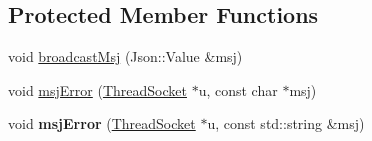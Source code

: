 \subsection*{Protected Member Functions}
\begin{DoxyCompactItemize}
\item 
void \hyperlink{classPartida_a515de07436fd6423d7da5d97952031e3}{broadcast\-Msj} (Json\-::\-Value \&msj)
\item 
void \hyperlink{classPartida_a395fb43392e03670c4c6a4a5f23bbd0c}{msj\-Error} (\hyperlink{classThreadSocket}{Thread\-Socket} $\ast$u, const char $\ast$msj)
\item 
\hypertarget{classPartida_af92865c689cd13fc25e16ee0424a6b80}{void {\bfseries msj\-Error} (\hyperlink{classThreadSocket}{Thread\-Socket} $\ast$u, const std\-::string \&msj)}\label{classPartida_af92865c689cd13fc25e16ee0424a6b80}

\end{DoxyCompactItemize}
